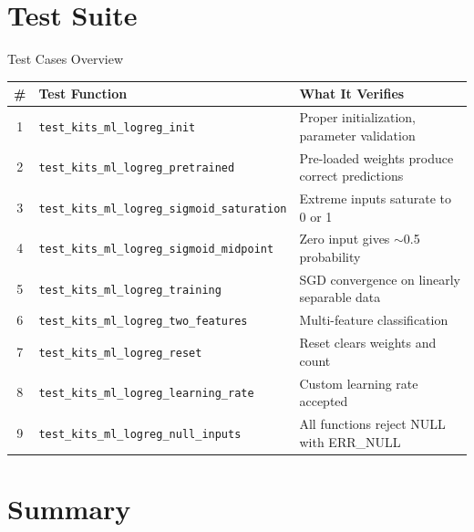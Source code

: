\documentclass[aspectratio=169, 10pt]{beamer}
\begin{document}
\section{Test Suite}

\begin{frame}{Test Cases Overview}
\begin{table}
\centering
\small
\begin{tabular}{@{}clp{7cm}@{}}
\toprule
\textbf{\#} & \textbf{Test Function} & \textbf{What It Verifies} \\
\midrule
1 & \texttt{test\_kits\_ml\_logreg\_init}
  & Proper initialization, parameter validation \\
2 & \texttt{test\_kits\_ml\_logreg\_pretrained}
  & Pre-loaded weights produce correct predictions \\
3 & \texttt{test\_kits\_ml\_logreg\_sigmoid\_saturation}
  & Extreme inputs saturate to 0 or 1 \\
4 & \texttt{test\_kits\_ml\_logreg\_sigmoid\_midpoint}
  & Zero input gives $\sim$0.5 probability \\
5 & \texttt{test\_kits\_ml\_logreg\_training}
  & SGD convergence on linearly separable data \\
6 & \texttt{test\_kits\_ml\_logreg\_two\_features}
  & Multi-feature classification \\
7 & \texttt{test\_kits\_ml\_logreg\_reset}
  & Reset clears weights and count \\
8 & \texttt{test\_kits\_ml\_logreg\_learning\_rate}
  & Custom learning rate accepted \\
9 & \texttt{test\_kits\_ml\_logreg\_null\_inputs}
  & All functions reject NULL with ERR\_NULL \\
\bottomrule
\end{tabular}
\end{table}
\end{frame}

\section{Summary}
\end{document}
